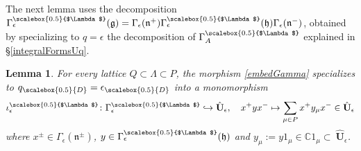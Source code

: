 \documentclass[11pt]{amsart}
\newtheorem{lem}[teo]{Lemma}
\newcommand{\e}{\epsilon}
\newcommand{\qD}{q_{\scalebox{0.5}{D}}}
\newcommand{\eD}{\epsilon_{\scalebox{0.5}{D}}}
\newcommand{\Lam}{{\scalebox{0.5}{$\Lambda$}}}
\begin{document}
The next lemma uses the decomposition $\Gamma^{\Lam}_{\epsilon}(\mathfrak{g}) = \Gamma_{\epsilon}(\mathfrak{n}^+)\Gamma^\Lam_{\epsilon}(\mathfrak{h})\Gamma_{\epsilon}(\mathfrak{n}^-)$, obtained by specializing to $q = \epsilon$ the decomposition of $\Gamma_A^\Lam$ explained in \S\ref{integralFormsUq}.
\begin{lem}\label{embedGammaeps}
For every lattice $Q\subset \Lambda \subset P$, the morphism \eqref{embedGamma} specializes to $\qD = \eD$ into a monomorphism
\begin{equation*}
\iota^\Lam_\e\colon\Gamma_\e^\Lam\hookrightarrow \hat{{\mathbf{U}}}_\e, \quad x^+ y x^{-} \mapsto \sum_{\mu\in P}x^+ y _\mu x^{-}\in \hat{{\mathbf{U}}}_\e
\end{equation*}
where $x^{\pm}\in \Gamma_\e(\mathfrak{n}^{\pm})$, $y\in \Gamma_\e^\Lam(\mathfrak{h})$ and $y_\mu:= y 1_{\mu}\in \mathbb{C}1_\mu \subset \:\hat{\mathbf{U}}_\e$.
\end{lem}
\end{document}
